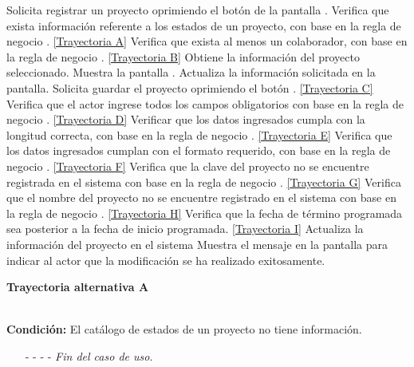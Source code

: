 	\begin{UCtrayectoria}
		\UCpaso[\UCactor] Solicita registrar un proyecto oprimiendo el botón \editar de la pantalla .
		\UCpaso[\UCsist] Verifica que exista información referente a los estados de un proyecto, con base en la regla de negocio . \hyperlink{CU2-2:TAA}{[Trayectoria A]}
		\UCpaso[\UCsist] Verifica que exista al menos un colaborador, con base en la regla de negocio . \hyperlink{CU2-2:TAB}{[Trayectoria B]}
		\UCpaso[\UCsist] Obtiene la información del proyecto seleccionado.
		\UCpaso[\UCsist] Muestra la pantalla .
		\UCpaso[\UCactor] Actualiza la información solicitada en la pantalla. \label{CU2.2-P5}
		\UCpaso[\UCactor] Solicita guardar el proyecto oprimiendo el botón . \hyperlink{CU2-2:TAC}{[Trayectoria C]}
		\UCpaso[\UCsist] Verifica que el actor ingrese todos los campos obligatorios con base en la regla de negocio . \hyperlink{CU2-2:TAD}{[Trayectoria D]}
		\UCpaso[\UCsist] Verificar que los datos ingresados cumpla con la longitud correcta, con base en la regla de negocio . \hyperlink{CU2-2:TAE}{[Trayectoria E]}
		\UCpaso[\UCsist] Verifica que los datos ingresados cumplan con el formato requerido, con base en la regla de negocio . \hyperlink{CU2-2:TAF}{[Trayectoria F]}
		\UCpaso[\UCsist] Verifica que la clave del proyecto no se encuentre registrada en el sistema con base en la regla de negocio . \hyperlink{CU2-2:TAG}{[Trayectoria G]}
		\UCpaso[\UCsist] Verifica que el nombre del proyecto no se encuentre registrado en el sistema con base en la regla de negocio . \hyperlink{CU2-2:TAH}{[Trayectoria H]}
		\UCpaso[\UCsist] Verifica que la fecha de término programada sea posterior a la fecha de inicio programada. \hyperlink{CU2-2:TAI}{[Trayectoria I]}
		\UCpaso[\UCsist] Actualiza la información del proyecto en el sistema
		\UCpaso[\UCsist] Muestra el mensaje  en la pantalla  para indicar al actor que la modificación se ha realizado exitosamente.
	\end{UCtrayectoria}		
	\hypertarget{CU2-2:TAA}{\textbf{Trayectoria alternativa A}}\\
	\noindent \textbf{Condición:} El catálogo de estados de un proyecto no tiene información.
	\begin{enumerate}
		\UCpaso[\UCsist] Muestra el mensaje  en la pantalla  para indicar que no es posible realizar la operación debido a la falta de información necesaria para el sistema.
		\item[- -] - - {\em {Fin del caso de uso}}.%
	\end{enumerate}
	
